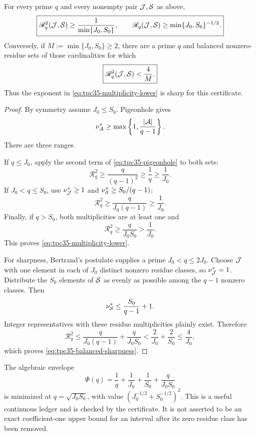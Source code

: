 \begin{theorem}
\label{thm:tpc35-multiplicity-saturation}
For every prime \(q\) and every nonempty pair \(\mathcal J,\mathcal S\) as above,
\begin{equation}
 \boxed{
 \mathscr R_q^2(\mathcal J,\mathcal S)
 \ge\frac1{\min\{J_0,S_0\}},
 \qquad
 \mathscr R_q(\mathcal J,\mathcal S)
 \ge\min\{J_0,S_0\}^{-1/2}.}
 \label{eq:tpc35-multiplicity-lower}
\end{equation}
Conversely, if \(M:=\min\{J_0,S_0\}\ge2\), there are a prime \(q\) and
balanced nonzero-residue sets of those cardinalities for which
\begin{equation}
 \boxed{
 \mathscr R_q^2(\mathcal J,\mathcal S)<\frac4M.}
 \label{eq:tpc35-balanced-sharpness}
\end{equation}
Thus the exponent in \eqref{eq:tpc35-multiplicity-lower} is sharp for
this certificate.
\end{theorem}

\begin{proof}
By symmetry assume \(J_0\le S_0\).  Pigeonhole gives
\begin{equation}
 \nu_{\mathcal A}^*\ge
 \max\left\{1,\frac{|\mathcal A|}{q-1}\right\}.
 \label{eq:tpc35-pigeonhole}
\end{equation}
There are three ranges.

If \(q\le J_0\), apply the second term of
\eqref{eq:tpc35-pigeonhole} to both sets:
\[
 \mathscr R_q^2
 \ge\frac{q}{(q-1)^2}\ge\frac1q\ge\frac1{J_0}.
\]
If \(J_0<q\le S_0\), use \(\nu_{\mathcal J}^*\ge1\) and
\(\nu_{\mathcal S}^*\ge S_0/(q-1)\):
\[
 \mathscr R_q^2\ge\frac{q}{J_0(q-1)}\ge\frac1{J_0}.
\]
Finally, if \(q>S_0\), both multiplicities are at least one and
\[
 \mathscr R_q^2\ge\frac{q}{J_0S_0}>\frac1{J_0}.
\]
This proves \eqref{eq:tpc35-multiplicity-lower}.

For sharpness, Bertrand's postulate supplies a prime
\(J_0<q\le2J_0\).  Choose \(\mathcal J\) with one element in each of \(J_0\)
distinct nonzero residue classes, so \(\nu_{\mathcal J}^*=1\).  Distribute the
\(S_0\) elements of \(\mathcal S\) as evenly as possible among the \(q-1\)
nonzero classes.  Then
\[
 \nu_{\mathcal S}^*\le\frac{S_0}{q-1}+1.
\]
Integer representatives with these residue multiplicities plainly
exist.  Therefore
\[
 \mathscr R_q^2
 \le\frac{q}{J_0(q-1)}+\frac{q}{J_0S_0}
 <\frac2{J_0}+\frac2{S_0}
 \le\frac4{J_0},
\]
which proves \eqref{eq:tpc35-balanced-sharpness}.
\end{proof}

\begin{remark}
The algebraic envelope
\[
 \Phi(q)=\frac1q+\frac1{J_0}+\frac1{S_0}
 +\frac{q}{J_0S_0}
\]
is minimized at \(q=\sqrt{J_0S_0}\), with value
\((J_0^{-1/2}+S_0^{-1/2})^2\).  This is a useful continuous ledger and is
checked by the certificate.  It is not asserted to be an exact
coefficient-one upper bound for an interval after its zero residue class
has been removed.
\end{remark}

